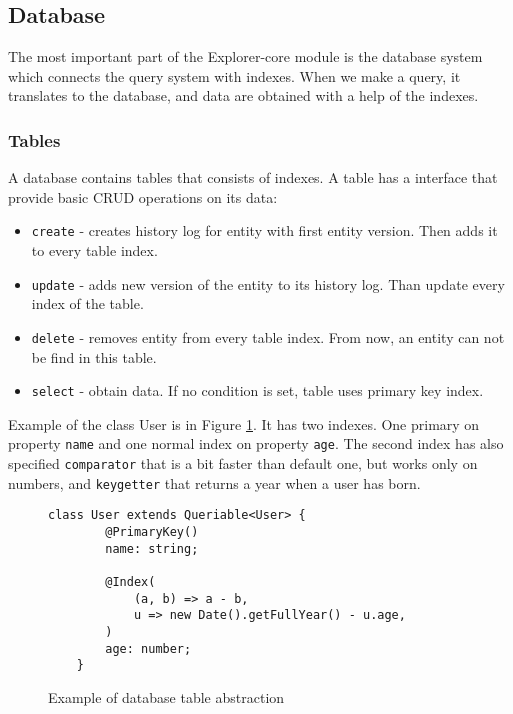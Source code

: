 \subsection{Database}
The most important part of the Explorer-core module is the database system which connects the query system with indexes. When we make a query, it translates to the database, and data are obtained with a help of the indexes.

\subsubsection{Tables}
A database contains tables that consists of indexes. A table has a interface that provide basic CRUD operations on its data:
\begin{itemize}
    \item \texttt{create} - creates history log for entity with first entity version. Then adds it to every table index.
    \item \texttt{update} - adds new version of the entity to its history log. Than update every index of the table.
    \item \texttt{delete} - removes entity from every table index. From now, an entity can not be find in this table.
    \item \texttt{select} - obtain data. If no condition is set, table uses primary key index.
\end{itemize}

Example of the class User is in Figure \ref{classExample}. It has two indexes. One primary on property \texttt{name} and one normal index on property \texttt{age}. The second index has also specified \texttt{comparator} that is a bit faster than default one, but works only on numbers, and \texttt{keygetter} that returns a year when a user has born. 

\begin{figure}[h]
    \centering
    \begin{lstlisting}[style=ES6]
    class User extends Queriable<User> {
        @PrimaryKey()
        name: string;

        @Index(
            (a, b) => a - b,
            u => new Date().getFullYear() - u.age,
        )
        age: number;
    }
    \end{lstlisting}
    \caption{Example of database table abstraction }
    \label{classExample}
\end{figure}



